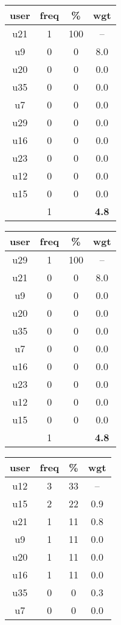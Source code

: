 \begin{appendices}
\begin{table}
\begin{tabular}{ |c|c|c|c| }
	\hline
	\textbf{user} & \textbf{freq} & \textbf{\%} & \textbf{wgt} \\
	\hline
	u21 & 1 & 100 & -- \\
	u9 & 0 & 0 & 8.0 \\
	u20 & 0 & 0 & 0.0 \\
	u35 & 0 & 0 & 0.0 \\
	u7 & 0 & 0 & 0.0 \\
	u29 & 0 & 0 & 0.0 \\
	u16 & 0 & 0 & 0.0 \\
	u23 & 0 & 0 & 0.0 \\
	u12 & 0 & 0 & 0.0 \\
	u15 & 0 & 0 & 0.0 \\
	 & 1 & & \textbf{4.8} \\
	\hline
\end{tabular}
\begin{tabular}{ |c|c|c|c| }
	\hline
	\textbf{user} & \textbf{freq} & \textbf{\%} & \textbf{wgt} \\
	\hline
	u29 & 1 & 100 & -- \\
	u21 & 0 & 0 & 8.0 \\
	u9 & 0 & 0 & 0.0 \\
	u20 & 0 & 0 & 0.0 \\
	u35 & 0 & 0 & 0.0 \\
	u7 & 0 & 0 & 0.0 \\
	u16 & 0 & 0 & 0.0 \\
	u23 & 0 & 0 & 0.0 \\
	u12 & 0 & 0 & 0.0 \\
	u15 & 0 & 0 & 0.0 \\
	 & 1 & & \textbf{4.8} \\
	\hline
\end{tabular}
\begin{tabular}{ |c|c|c|c| }
	\hline
	\textbf{user} & \textbf{freq} & \textbf{\%} & \textbf{wgt} \\
	\hline
	u12 & 3 & 33 & -- \\
	u15 & 2 & 22 & 0.9 \\
	u21 & 1 & 11 & 0.8 \\
	u9 & 1 & 11 & 0.0 \\
	u20 & 1 & 11 & 0.0 \\
	u16 & 1 & 11 & 0.0 \\
	u35 & 0 & 0 & 0.3 \\
	u7 & 0 & 0 & 0.0 \\

\end{tabular}
\end{table}
\end{appendices}
